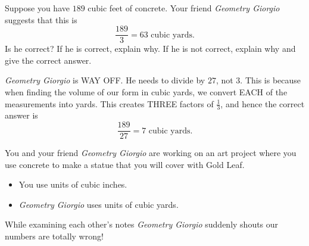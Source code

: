 \documentclass[handout,nooutcomes,noauthor]{ximera}
\begin{document}
\begin{question}
  Suppose you have $189$ cubic feet of concrete. Your friend \textit{Geometry
    Giorgio} suggests that this is
  \[
  \frac{189}{3} = 63 \text{ cubic yards}.
  \]
  Is he correct? If he is correct, explain why. If he is not correct,
  explain why and give the correct answer.
  \begin{freeResponse}
     \textit{Geometry Giorgio} is WAY OFF. He needs to divide by $27$,
     not $3$. This is because when finding the volume of our form in
     cubic yards, we convert EACH of the measurements into yards. This
     creates THREE factors of $\frac{1}{3}$, and hence the correct
     answer is
     \[
     \frac{189}{27} = 7 \text{ cubic yards}.
     \]
  \end{freeResponse}
\end{question}
\mynewpage



\begin{question}
  You and your friend \textit{Geometry Giorgio} are working on an art
  project where you use concrete to make a statue that you will cover
  with Gold Leaf.
  \begin{itemize}
  \item You use units of cubic inches.
  \item \textit{Geometry Giorgio} uses units of cubic yards.
  \end{itemize}
  While examining each other's notes \textit{Geometry Giorgio}
  suddenly shouts our numbers are totally wrong!



  
  

\end{question}





\end{document}
